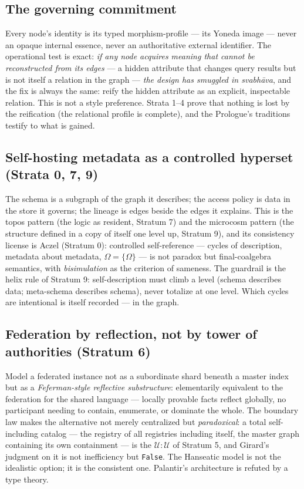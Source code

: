 \documentclass[11pt]{article}
\theoremstyle{plain}
\theoremstyle{definition}
\theoremstyle{remark}
\newcommand{\U}{\mathcal{U}}
\begin{document}
\subsection{The governing commitment}

Every node's identity is its typed morphism-profile --- its Yoneda image --- never an opaque internal essence, never an authoritative external identifier. The operational test is exact: \emph{if any node acquires meaning that cannot be reconstructed from its edges} --- a hidden attribute that changes query results but is not itself a relation in the graph --- \emph{the design has smuggled in svabh\=ava}, and the fix is always the same: reify the hidden attribute as an explicit, inspectable relation. This is not a style preference. Strata 1--4 prove that nothing is lost by the reification (the relational profile is complete), and the Prologue's traditions testify to what is gained.

\subsection{Self-hosting metadata as a controlled hyperset (Strata 0, 7, 9)}

The schema is a subgraph of the graph it describes; the access policy is data in the store it governs; the lineage is edges beside the edges it explains. This is the topos pattern (the logic as resident, Stratum 7) and the microcosm pattern (the structure defined in a copy of itself one level up, Stratum 9), and its consistency license is Aczel (Stratum 0): controlled self-reference --- cycles of description, metadata about metadata, $\Omega = \{\Omega\}$ --- is not paradox but final-coalgebra semantics, with \emph{bisimulation} as the criterion of sameness. The guardrail is the helix rule of Stratum 9: self-description must climb a level (schema describes data; meta-schema describes schema), never totalize at one level. Which cycles are intentional is itself recorded --- in the graph.

\subsection{Federation by reflection, not by tower of authorities (Stratum 6)}

Model a federated instance not as a subordinate shard beneath a master index but as a \emph{Feferman-style reflective substructure}: elementarily equivalent to the federation for the shared language --- locally provable facts reflect globally, no participant needing to contain, enumerate, or dominate the whole. The boundary law makes the alternative not merely centralized but \emph{paradoxical}: a total self-including catalog --- the registry of all registries including itself, the master graph containing its own containment --- is the $\U : \U$ of Stratum 5, and Girard's judgment on it is not inefficiency but \texttt{False}. The Hanseatic model is not the idealistic option; it is the consistent one. Palantir's architecture is refuted by a type theory.
\end{document}
